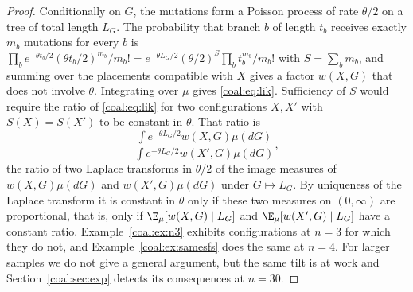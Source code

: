 \begin{proof}
Conditionally on $G$, the mutations form a Poisson process of rate $\theta/2$ on a tree of total length $L_G$. The probability that branch $b$ of length $t_b$ receives exactly $m_b$ mutations for every $b$ is $\prod_be^{-\theta t_b/2}(\theta t_b/2)^{m_b}/m_b!=e^{-\theta L_G/2}(\theta/2)^{S}\prod_bt_b^{m_b}/m_b!$ with $S=\sum_bm_b$, and summing over the placements compatible with $X$ gives a factor $w(X,G)$ that does not involve $\theta$. Integrating over $\mu$ gives \eqref{coal:eq:lik}. Sufficiency of $S$ would require the ratio of \eqref{coal:eq:lik} for two configurations $X,X'$ with $S(X)=S(X')$ to be constant in $\theta$. That ratio is
\[
\frac{\int e^{-\theta L_G/2}w(X,G)\mu(dG)}{\int e^{-\theta L_G/2}w(X',G)\mu(dG)},
\]
the ratio of two Laplace transforms in $\theta/2$ of the image measures of $w(X,G)\mu(dG)$ and $w(X',G)\mu(dG)$ under $G\mapsto L_G$. By uniqueness of the Laplace transform it is constant in $\theta$ only if these two measures on $(0,\infty)$ are proportional, that is, only if $\E_\mu[w(X,G)\mid L_G]$ and $\E_\mu[w(X',G)\mid L_G]$ have a constant ratio. Example~\ref{coal:ex:n3} exhibits configurations at $n=3$ for which they do not, and Example~\ref{coal:ex:samesfs} does the same at $n=4$. For larger samples we do not give a general argument, but the same tilt is at work and Section~\ref{coal:sec:exp} detects its consequences at $n=30$.
\end{proof}

